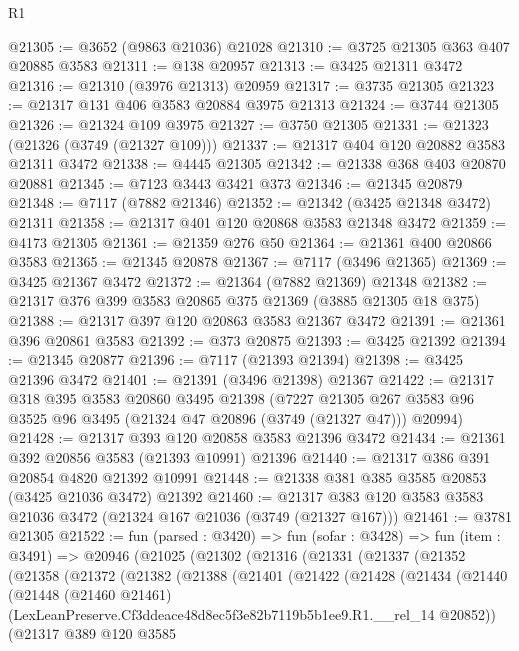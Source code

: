 \begin{lexlean}{R1}
\begin{coremodule}
@21305 := @3652 (@9863 @21036) @21028
@21310 := @3725 @21305 @363 @407 @20885 @3583
@21311 := @138 @20957
@21313 := @3425 @21311 @3472
@21316 := @21310 (@3976 @21313) @20959
@21317 := @3735 @21305
@21323 := @21317 @131 @406 @3583 @20884 @3975 @21313
@21324 := @3744 @21305
@21326 := @21324 @109 @3975
@21327 := @3750 @21305
@21331 := @21323 (@21326 (@3749 (@21327 @109)))
@21337 := @21317 @404 @120 @20882 @3583 @21311 @3472
@21338 := @4445 @21305
@21342 := @21338 @368 @403 @20870 @20881
@21345 := @7123 @3443 @3421 @373
@21346 := @21345 @20879
@21348 := @7117 (@7882 @21346)
@21352 := @21342 (@3425 @21348 @3472) @21311
@21358 := @21317 @401 @120 @20868 @3583 @21348 @3472
@21359 := @4173 @21305
@21361 := @21359 @276 @50
@21364 := @21361 @400 @20866 @3583
@21365 := @21345 @20878
@21367 := @7117 (@3496 @21365)
@21369 := @3425 @21367 @3472
@21372 := @21364 (@7882 @21369) @21348
@21382 := @21317 @376 @399 @3583 @20865 @375 @21369 (@3885 @21305 @18 @375)
@21388 := @21317 @397 @120 @20863 @3583 @21367 @3472
@21391 := @21361 @396 @20861 @3583
@21392 := @373 @20875
@21393 := @3425 @21392
@21394 := @21345 @20877
@21396 := @7117 (@21393 @21394)
@21398 := @3425 @21396 @3472
@21401 := @21391 (@3496 @21398) @21367
@21422 := @21317
    @318
    @395
    @3583
    @20860
    @3495
    @21398
    (@7227 @21305 @267 @3583 @96 @3525 @96 @3495 (@21324 @47 @20896 (@3749 (@21327 @47))) @20994)
@21428 := @21317 @393 @120 @20858 @3583 @21396 @3472
@21434 := @21361 @392 @20856 @3583 (@21393 @10991) @21396
@21440 := @21317 @386 @391 @20854 @4820 @21392 @10991
@21448 := @21338 @381 @385 @3585 @20853 (@3425 @21036 @3472) @21392
@21460 := @21317 @383 @120 @3583 @3583 @21036 @3472 (@21324 @167 @21036 (@3749 (@21327 @167)))
@21461 := @3781 @21305
@21522 := fun (parsed : @3420) =>
  fun (sofar : @3428) =>
  fun (item : @3491) =>
  @20946
    (@21025
      (@21302
        (@21316
          (@21331
            (@21337
              (@21352
                (@21358
                  (@21372
                    (@21382
                      (@21388
                        (@21401
                          (@21422
                            (@21428
                              (@21434
                                (@21440
                                  (@21448
                                    (@21460 @21461)
                                    (LexLeanPreserve.Cf3ddeace48d8ec5f3e82b7119b5b1ee9.R1.__rel_14
                                      @20852))
                                  (@21317
                                    @389
                                    @120
                                    @3585

\end{coremodule}
\end{lexlean}
